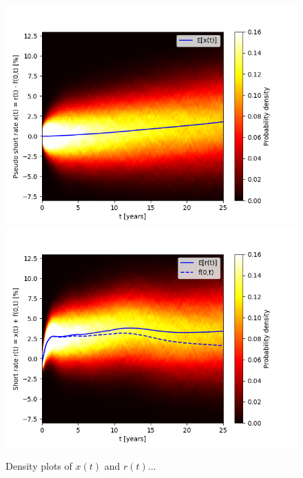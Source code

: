 \documentclass{report}
\begin{document}
\begin{figure}
\centering
\includegraphics[scale=0.7]{figures/pseudo_short_rate_density.png}
\includegraphics[scale=0.7]{figures/short_rate_density.png}
\caption{Density plots of $x(t)$ and $r(t)$...}
\end{figure}
\end{document}
